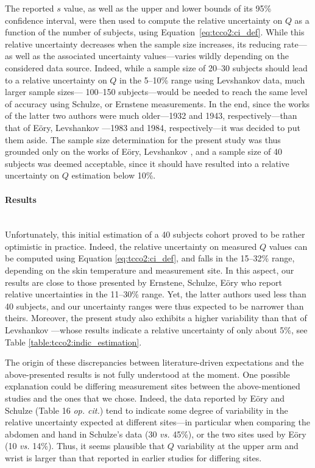 The reported $s$ value, as well as the upper and lower bounds of its 95\% confidence interval, were then used to compute the relative uncertainty on $Q$ as a function of the number of subjects, using Equation~\ref{eq:tcco2:ci_def}. While this relative uncertainty decreases when the sample size increases, its reducing rate---as well as the associated uncertainty values---varies wildly depending on the considered data source. Indeed, while a sample size of 20--30 subjects should lead to a relative uncertainty on $Q$ in the 5--10\% range using Levshankov \etal{} data, much larger sample sizes---\ie{} 100--150 subjects---would be needed to reach the same level of accuracy using Schulze, or Ernstene \etal{} measurements. In the end, since the works of the latter two authors were much older---1932 and 1943, respectively---than that of Eöry, Levshankov \etal{}---1983 and 1984, respectively---it was decided to put them aside. The sample size determination for the present study was thus grounded only on the works of Eöry, Levshankov \etal{}, and a sample size of 40 subjects was deemed acceptable, since it should have resulted into a relative uncertainty on $Q$ estimation below 10\%.

\paragraph{Results}\label{subsect:tcco2:ss_result}\mbox{}\\

Unfortunately, this initial estimation of a 40 subjects cohort proved to be rather optimistic in practice. Indeed, the relative uncertainty on measured $Q$ values can be computed using Equation \ref{eq:tcco2:ci_def}, and falls in the 15--32\% range, depending on the skin temperature and measurement site. In this aspect, our results are close to those presented by Ernstene, Schulze, Eöry \etal{}\cite{ernstene1932a, schulze1943, eory1984} who report relative uncertainties in the 11--30\% range. Yet, the latter authors used less than 40 subjects, and our uncertainty ranges were thus expected to be narrower than theirs. Moreover, the present study also exhibits a higher variability than that of Levshankov \etal{}\cite{levshankov1983}---whose results indicate a relative uncertainty of only about 5\%, see Table \ref{table:tcco2:indic_estimation}.

The origin of these discrepancies between literature-driven expectations and the above-presen\-ted results is not fully understood at the moment. One possible explanation could be differing measurement sites between the above-mentioned studies and the ones that we chose. Indeed, the data reported by Eöry and Schulze (Table 16 \textit{op. cit.}) tend to indicate some degree of variability in the relative uncertainty expected at different sites---in particular when comparing the abdomen and hand in Schulze's data (30 \textit{vs.} 45\%), or the two sites used by Eöry (10 \textit{vs.} 14\%). Thus, it seems plausible that $Q$ variability at the upper arm and wrist is larger than that reported in earlier studies for differing sites.

